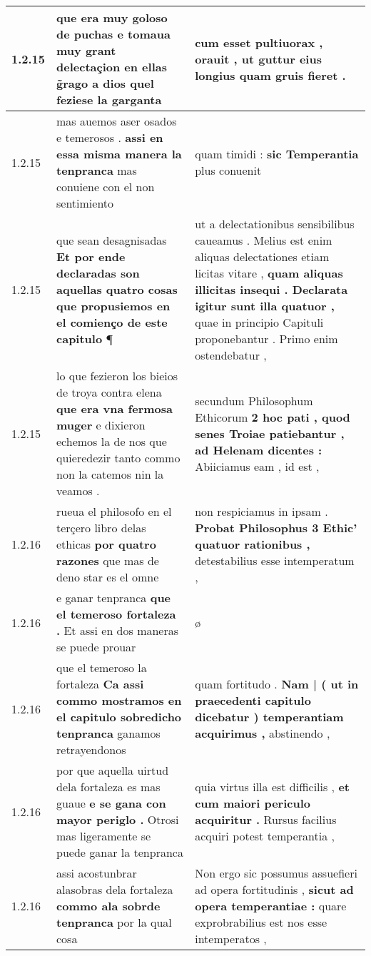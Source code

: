\begin{tabular}{|p{1cm}|p{6.5cm}|p{6.5cm}|}
1.2.15 & que era muy goloso de puchas \textbf{ e tomaua muy grant delectaçion en ellas } g̃rago a dios quel feziese la garganta & cum esset pultiuorax , \textbf{ orauit , } ut guttur eius longius quam gruis fieret . \\\hline
1.2.15 & mas auemos aser osados e temerosos . \textbf{ assi en essa misma manera la tenpranca } mas conuiene con el non sentimiento & quam timidi : \textbf{ sic Temperantia } plus conuenit \\\hline
1.2.15 & que sean desagnisadas \textbf{ Et por ende declaradas son aquellas quatro cosas que propusiemos en el comienço de este capitulo } ¶ & ut a delectationibus sensibilibus caueamus . Melius est enim aliquas delectationes etiam licitas vitare , \textbf{ quam aliquas illicitas insequi . Declarata igitur sunt illa quatuor , } quae in principio Capituli proponebantur . Primo enim ostendebatur , \\\hline
1.2.15 & lo que fezieron los bieios de troya contra elena \textbf{ que era vna fermosa muger } e dixieron echemos la de nos que quieredezir tanto commo non la catemos nin la veamos . & secundum Philosophum Ethicorum \textbf{ 2 hoc pati , quod senes Troiae patiebantur , ad Helenam dicentes : } Abiiciamus eam , id est , \\\hline
1.2.16 & rueua el philosofo en el terçero libro delas ethicas \textbf{ por quatro razones } que mas de deno star es el omne & non respiciamus in ipsam . \textbf{ Probat Philosophus 3 Ethic’ quatuor rationibus , } detestabilius esse intemperatum , \\\hline
1.2.16 & e ganar tenpranca \textbf{ que el temeroso fortaleza . } Et assi en dos maneras se puede prouar & ø \\\hline
1.2.16 & que el temeroso la fortaleza \textbf{ Ca assi commo mostramos en el capitulo sobredicho tenpranca } ganamos retrayendonos & quam fortitudo . \textbf{ Nam | ( ut in praecedenti capitulo dicebatur ) temperantiam acquirimus , } abstinendo , \\\hline
1.2.16 & por que aquella uirtud dela fortaleza es mas guaue \textbf{ e se gana con mayor periglo . } Otrosi mas ligeramente se puede ganar la tenpranca & quia virtus illa est difficilis , \textbf{ et cum maiori periculo acquiritur . } Rursus facilius acquiri potest temperantia , \\\hline
1.2.16 & assi acostunbrar alasobras dela fortaleza \textbf{ commo ala sobrde tenpranca } por la qual cosa & Non ergo sic possumus assuefieri ad opera fortitudinis , \textbf{ sicut ad opera temperantiae : } quare exprobrabilius est nos esse intemperatos , \\\hline

\end{tabular}
